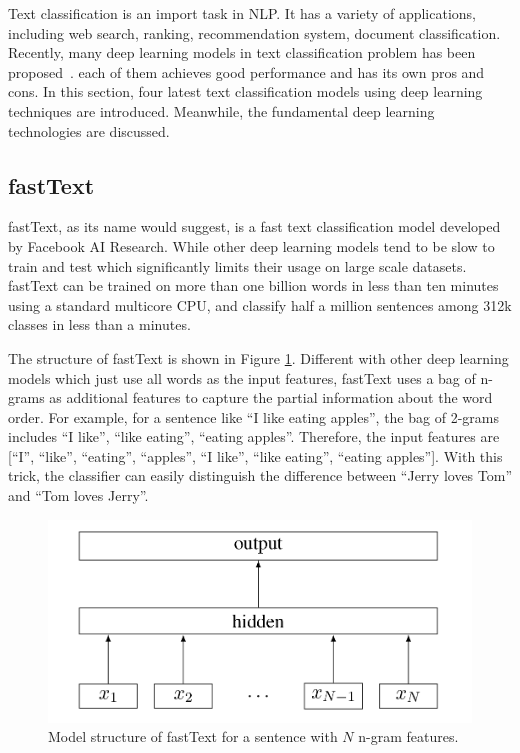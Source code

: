 Text classification is an import task in NLP. It has a variety of applications, including web search, ranking, recommendation system, document classification. Recently, many deep learning models in text classification problem has been proposed~\cite{Joulin2016}\cite{zhang2015character}. each of them achieves good performance and has its own pros and cons. In this section, four latest text classification models using deep learning techniques are introduced. Meanwhile, the fundamental deep learning technologies are discussed. 


\subsection{fastText}

fastText, as its name would suggest, is a fast text classification model developed by Facebook AI Research. While other deep learning models tend to be slow to train and test which significantly limits their usage on large scale datasets. fastText can be trained on more than one billion words in less than ten minutes using a standard multicore CPU, and classify half a million sentences among 312k classes in less than a minutes.

The structure of fastText is shown in Figure \ref{fasttext_structure}. Different with other deep learning models which just use all words as the input features, fastText uses a bag of n-grams as additional features to capture the partial information about the word order. For example, for a sentence like ``I like eating apples'', the bag of 2-grams includes ``I like'', ``like eating'', ``eating apples''. Therefore, the input features are [``I'', ``like'', ``eating'', ``apples'', ``I like'', ``like eating'', ``eating apples'']. With this trick, the classifier can easily distinguish the difference between ``Jerry loves Tom'' and ``Tom loves Jerry''.

\begin{figure}
\centering
\caption{Model structure of fastText for a sentence with $N$ n-gram features.}
\label{fasttext_structure}
\includegraphics{fasttext_structure.png}

\end{figure}

